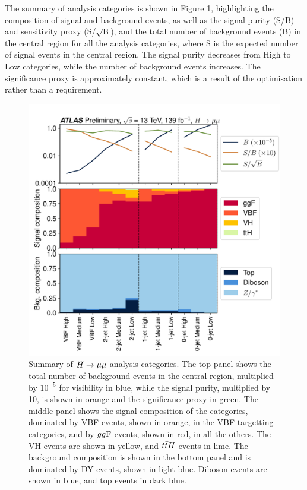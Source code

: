 The summary of analysis categories is shown in Figure \ref{fig:hmumu:cat-summary},
highlighting the composition of signal and background events, as well
as the signal purity (S/B) and sensitivity proxy (S/$\sqrt{\text{B}}$),
and the total number of background events (B) in the central region for
all the analysis categories, where S is the expected number of signal events
in the central region. The signal purity decreases from High to
Low categories, while the number of background events increases. The
significance proxy is approximately constant, which is a result of the 
optimisation rather than a requirement.
\begin{figure}[h!]
  \centering
  \includegraphics[width=1.0\textwidth]{figures/hmumu/cat-summary}
  \caption[Summary of $\hmumu$ analysis categories]{Summary of $\hmumu$
  analysis categories. The top panel shows the total number of background events
  in the central region, multiplied by $10^{-5}$ for visibility in blue,
  while the signal purity, multiplied by 10, is shown in orange and the
  significance proxy in green. The middle panel shows the signal
  composition of the categories, dominated by VBF events, shown in orange,
  in the VBF targetting categories, and by $gg\text{F}$ events, shown in red,
  in all the others. The VH events are shown in yellow, and $t\bar{t} H$ events
  in lime. The background composition is shown in the bottom 
  panel and is dominated by DY events, shown in light blue. Diboson events
  are shown in blue, and top events in dark blue.
  }
  \label{fig:hmumu:cat-summary}
\end{figure}

